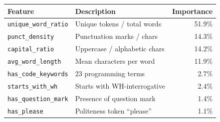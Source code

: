 \begin{tabular}{@{}lp{4.2cm}r@{}}
\toprule
Feature & Description & Importance \\
\midrule
\texttt{unique\_word\_ratio} & Unique tokens / total words & 51.9\% \\
\texttt{punct\_density} & Punctuation marks / chars & 14.3\% \\
\texttt{capital\_ratio} & Uppercase / alphabetic chars & 14.2\% \\
\texttt{avg\_word\_length} & Mean characters per word & 11.9\% \\
\texttt{has\_code\_keywords} & 23 programming terms & 2.7\% \\
\texttt{starts\_with\_wh} & Starts with WH-interrogative & 2.4\% \\
\texttt{has\_question\_mark} & Presence of question mark & 1.4\% \\
\texttt{has\_please} & Politeness token ``please'' & 1.1\% \\
\bottomrule
\end{tabular}